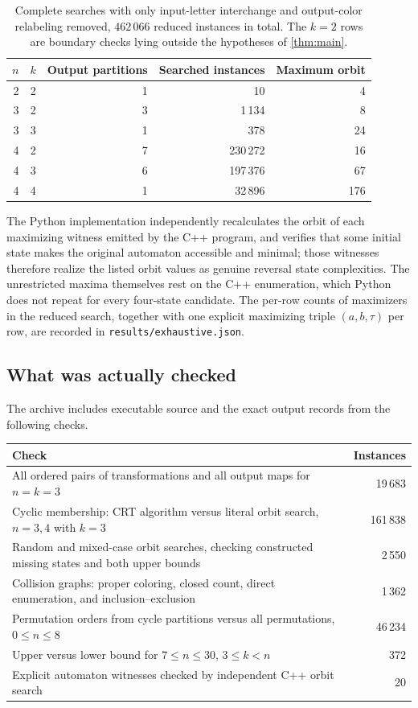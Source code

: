 \documentclass[11pt,a4paper]{article}
\numberwithin{equation}{section}
\theoremstyle{definition}
\theoremstyle{remark}
\begin{document}
\begin{table}[htbp]
\centering
\begin{tabular}{@{}rrrrr@{}}
\toprule
$n$ & $k$ & Output partitions & Searched instances & Maximum orbit\\
\midrule
2 & 2 & 1 & 10 & 4\\
3 & 2 & 3 & 1\,134 & 8\\
3 & 3 & 1 & 378 & 24\\
4 & 2 & 7 & 230\,272 & 16\\
4 & 3 & 6 & 197\,376 & 67\\
4 & 4 & 1 & 32\,896 & 176\\
\bottomrule
\end{tabular}
\caption{Complete searches with only input-letter interchange and
output-color relabeling removed, $462\,066$ reduced instances in total.
The $k=2$ rows are boundary checks lying outside the hypotheses of
\cref{thm:main}.}
\label{tab:exhaustive}
\end{table}

The Python implementation independently recalculates the orbit of each
maximizing witness emitted by the C++ program, and verifies that some initial
state makes the original automaton accessible and minimal; those witnesses
therefore realize the listed orbit values as genuine reversal state
complexities. The unrestricted maxima themselves rest on the C++
enumeration, which Python does not repeat for every four-state candidate.
The per-row counts of maximizers in the reduced search, together with one
explicit maximizing triple $(a,b,\tau)$ per row, are recorded in
\texttt{results/exhaustive.json}.

\subsection{What was actually checked}

The archive includes executable source and the exact output records from the
following checks.
\begin{center}
\begin{tabular}{@{}p{}r@{}}
\toprule
Check & Instances\\
\midrule
All ordered pairs of transformations and all output maps for $n=k=3$ & 19\,683\\
Cyclic membership: CRT algorithm versus literal orbit search,
$n=3,4$ with $k=3$ & 161\,838\\
Random and mixed-case orbit searches, checking constructed missing states
and both upper bounds & 2\,550\\
Collision graphs: proper coloring, closed count, direct enumeration,
and inclusion--exclusion & 1\,362\\
Permutation orders from cycle partitions versus all permutations,
$0\le n\le8$ & 46\,234\\
Upper versus lower bound for $7\le n\le30$, $3\le k<n$ & 372\\
Explicit automaton witnesses checked by independent C++ orbit search & 20\\
\bottomrule
\end{tabular}
\end{center}
\end{document}
